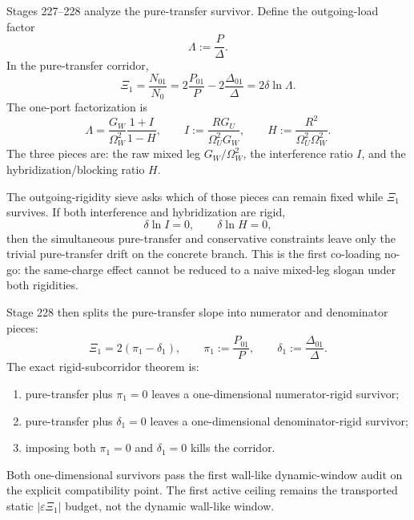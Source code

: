 Stages 227--228 analyze the pure-transfer survivor.  Define the outgoing-load factor
\begin{equation}
\label{eq:part07-load-factor-lambda}
\Lambda:=\frac{P}{\Delta}.
\end{equation}
In the pure-transfer corridor,
\begin{equation}
\label{eq:part07-xi-lambda}
\Xi_1=\frac{N_{01}}{N_0}=2\frac{P_{01}}{P}-2\frac{\Delta_{01}}{\Delta}=2\delta\ln\Lambda.
\end{equation}
The one-port factorization is
\begin{equation}
\label{eq:part07-lambda-factorization}
\Lambda
=
\frac{G_W}{\Omega_W^2}\frac{1+I}{1-H},
\qquad
I:=\frac{RG_U}{\Omega_U^2G_W},
\qquad
H:=\frac{R^2}{\Omega_U^2\Omega_W^2}.
\end{equation}
The three pieces are: the raw mixed leg \(G_W/\Omega_W^2\), the interference ratio \(I\), and the hybridization/blocking ratio \(H\).

The outgoing-rigidity sieve asks which of those pieces can remain fixed while \(\Xi_1\) survives.  If both interference and hybridization are rigid,
\begin{equation}
\label{eq:part07-co-loading-no-go-hypothesis}
\delta\ln I=0,
\qquad
\delta\ln H=0,
\end{equation}
then the simultaneous pure-transfer and conservative constraints leave only the trivial pure-transfer drift on the concrete branch.  This is the first co-loading no-go: the same-charge effect cannot be reduced to a naive mixed-leg slogan under both rigidities.

Stage 228 then splits the pure-transfer slope into numerator and denominator pieces:
\begin{equation}
\label{eq:part07-numerator-denominator-split}
\Xi_1=2(\pi_1-\delta_1),
\qquad
\pi_1:=\frac{P_{01}}{P},
\qquad
\delta_1:=\frac{\Delta_{01}}{\Delta}.
\end{equation}
The exact rigid-subcorridor theorem is:
\begin{enumerate}[leftmargin=2.2em]
  \item pure-transfer plus \(\pi_1=0\) leaves a one-dimensional numerator-rigid survivor;
  \item pure-transfer plus \(\delta_1=0\) leaves a one-dimensional denominator-rigid survivor;
  \item imposing both \(\pi_1=0\) and \(\delta_1=0\) kills the corridor.
\end{enumerate}
Both one-dimensional survivors pass the first wall-like dynamic-window audit on the explicit compatibility point.  The first active ceiling remains the transported static \(|\varepsilon\Xi_1|\) budget, not the dynamic wall-like window.

